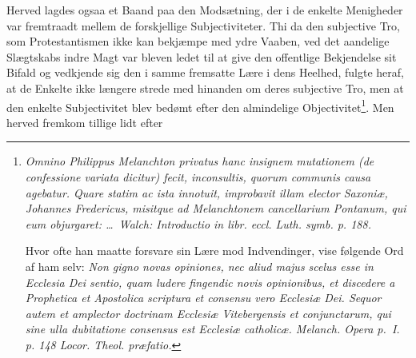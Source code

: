 \documentclass[12pt]{book}
\newcommand{\opage}[1]{\marginnote{\footnotesize\textit{[#1]}}}
\begin{document}
Herved lagdes ogsaa et Baand paa den Modsætning, der i de enkelte Menigheder
var fremtraadt mellem de forskjellige Subjectiviteter. Thi da den subjective
Tro, som Protestantismen ikke kan bekjæmpe med ydre Vaaben, ved det aandelige
Slægtskabs indre Magt var bleven ledet til at give den offentlige Bekjendelse
sit Bifald og vedkjende sig den i samme fremsatte Lære i dens Heelhed, fulgte
heraf, at de Enkelte ikke længere strede med hinanden om deres subjective
Tro, men at den enkelte Subjectivitet blev bedømt efter den almindelige
Objectivitet\footnote{\textit{Omnino Philippus Melanchton privatus hanc
insignem mutationem (de confessione variata dicitur) fecit, inconsultis,
quorum communis causa agebatur. Quare statim ac ista innotuit, improbavit
illam elector Saxoniæ, Johannes Fredericus, misitque ad Melanchtonem
cancellarium Pontanum, qui eum objurgaret: \ldots\ Walch: Introductio in
libr. eccl. Luth. symb. p. 188.}

Hvor ofte han maatte forsvare sin Lære mod Indvendinger, vise følgende Ord af
ham selv: \textit{Non gigno novas opiniones, nec aliud majus scelus esse in
Ecclesia Dei sentio, quam ludere fingendic novis opinionibus, et discedere a
Prophetica et Apostolica scriptura et consensu vero Ecclesiæ Dei. \emph{Sequor
autem et amplector doctrinam Ecclesiæ Vitebergensis et conjunctarum, qui sine
ulla dubitatione consensus est Ecclesiæ catholicæ.} Melanch. Opera p.~I. p. 148
Locor. Theol. præfatio.}}. Men herved fremkom tillige lidt efter
\opage{73} \setcounter{footnote}{0}%
\end{document}

